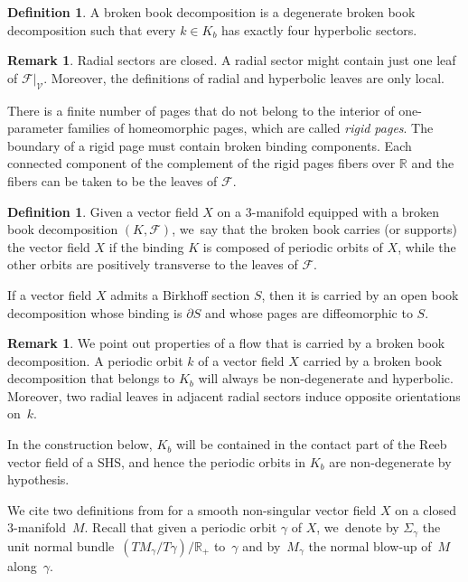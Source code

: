 \documentclass[JEP,XML,SOM,Unicode,NoEqCountersInSection,NoFloatCountersInSection,published]{cedram}
\newcommand{\threemanifold}{$3$\nobreakdash-mani\-fold\xspace}
\theoremstyle{definition}
\newtheorem{defi}[theorem]{Definition}
\newtheorem{Remark}[theorem]{Remark}
\newcommand\R{\mathbb{R}}
\begin{document}
\begin{defi}\label{defn:BBD2}
A broken book decomposition is a degenerate broken book decomposition such that every $k\in K_b$ has exactly four hyperbolic sectors.
\end{defi}

\begin{Remark}
Radial sectors are closed. A radial sector might contain just one leaf of $\mathcal{F}|_{\mathcal{V}}$. Moreover, the definitions of radial and hyperbolic leaves are only local.
\end{Remark}

There is a finite number of pages that do not belong to the interior of one-parameter families of homeomorphic pages, which are called \emph{rigid pages}. The boundary of a rigid page must contain broken binding components. Each connected component of the complement of the rigid pages fibers over $\mathbb{R}$ and the fibers can be taken to be the leaves of $\mathcal{F}$.

\begin{defi}
Given a vector field $X$ on a \threemanifold equipped with a broken book decomposition $(K,\mathcal{F})$, we~say that the broken book carries (or supports) the vector field $X$ if the binding $K$ is composed of periodic orbits of $X$, while the other orbits are positively transverse to the leaves of $\mathcal{F}$.
\end{defi}

If a vector field $X$ admits a Birkhoff section $S$, then it is carried by an open book decomposition whose binding is $\partial S$ and whose pages are diffeomorphic to $S$.

\begin{Remark}\label{rem:orientation}
We point out properties of a flow that is carried by a broken book decomposition. A periodic orbit $k$ of a vector field $X$ carried by a broken book decomposition that belongs to $K_b$ will always be non-degenerate and hyperbolic. Moreover, two radial leaves in adjacent radial sectors induce opposite orientations on~$k$.
\end{Remark}

In the construction below, $K_b$ will be contained in the contact part of the Reeb vector field of a SHS, and hence the periodic orbits in $K_b$ are non-degenerate by hypothesis.

We cite two definitions from \cite{CDR} for a smooth non-singular vector field $X$ on a closed \threemanifold~$M$. Recall that given a periodic orbit $\gamma$ of $X$, we~denote by $\Sigma_\gamma$ the unit normal bundle~$(TM_\gamma/T\gamma)/\R_+$ to~$\gamma$ and by~$M_\gamma$ the normal blow-up of~$M$ along~$\gamma$.
\end{document}

